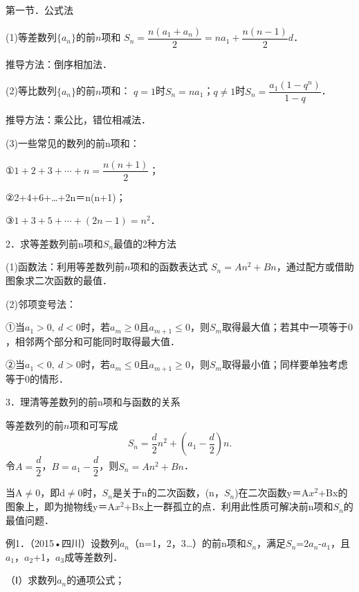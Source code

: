\par\bigskip{}\par
第一节．公式法\par
\qquad{}(1)等差数列$\{a_n\}$的前$n$项和
$S_n=\dfrac{n(a_1+a_n)}2=na_1+\dfrac{n(n-1)}2d$．\par
\qquad{}推导方法：倒序相加法．\par
\qquad{}(2)等比数列$\{a_n\}$的前$n$项和：
$q=1$时$S_n=na_1$；$q\ne1$时$S_n=\dfrac{a_1(1-q^n)}{1-q}$．\par
\qquad{}推导方法：乘公比，错位相减法．\par
\qquad{}(3)一些常见的数列的前n项和：\par
\qquad{}①$1+2+3+\cdots+n=\dfrac{n(n+1)}2$；\par
\qquad{}②2+4+6+\ldots{}+2n＝n(n+1)；\par
\qquad{}③$1+3+5+\cdots+(2n-1)=n^2$．\par
{}
\qquad{}2．求等差数列前n项和\ensuremath{S_{n}}最值的2种方法\par
\qquad{}(1)函数法：利用等差数列前$n$项和的函数表达式
$S_n=An^2+Bn$，通过配方或借助图象求二次函数的最值．\par
\qquad{}(2)邻项变号法：\par
\qquad{}①当$a_1>0,\ d<0$时，若$a_m\geq0$且$a_{m+1}\leq0$，则$S_m$取得最大值；若其中一项等于$0$，相邻两个部分和可能同时取得最大值．\par
\qquad{}②当$a_1<0,\ d>0$时，若$a_m\leq0$且$a_{m+1}\geq0$，则$S_m$取得最小值；同样要单独考虑等于$0$的情形．\par
\qquad{}3．理清等差数列的前n项和与函数的关系\par
\qquad{}等差数列的前$n$项和可写成
\[
S_n=\frac d2n^2+\left(a_1-\frac d2\right)n.
\]
令$A=\dfrac d2$，$B=a_1-\dfrac d2$，则$S_n=An^2+Bn$．\par
\qquad{}当A\ensuremath{\ne}0，即d\ensuremath{\ne}0时，\ensuremath{S_{n}}是关于n的二次函数，(n，\ensuremath{S_{n}})在二次函数y＝A\ensuremath{x^{2}}+Bx的图象上，即为抛物线y＝A\ensuremath{x^{2}}+Bx上一群孤立的点．利用此性质可解决前n项和\ensuremath{S_{n}}的最值问题．\par
{}
例1．（2015•四川）设数列{\ensuremath{a_{n}}}（n=1，2，3\ldots{}）的前n项和\ensuremath{S_{n}}，满足\ensuremath{S_{n}}=2\ensuremath{a_{n}}-\ensuremath{a_{1}}，且\ensuremath{a_{1}}，\ensuremath{a_{2}}+1，\ensuremath{a_{3}}成等差数列．\par
（Ⅰ）求数列{\ensuremath{a_{n}}}的通项公式；\par
